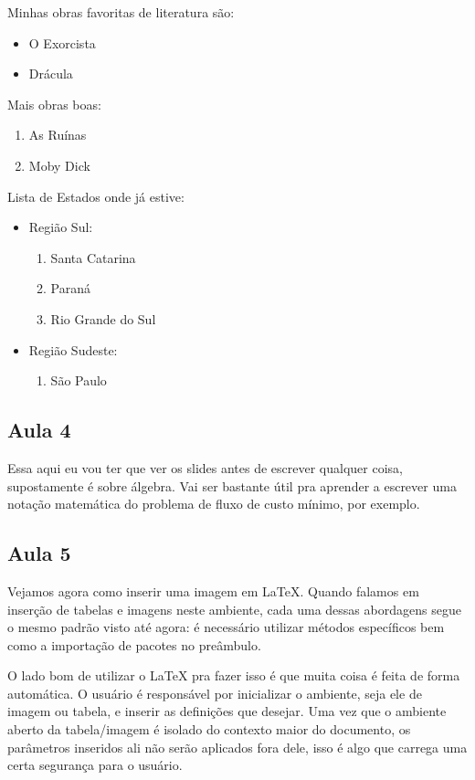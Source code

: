 \documentclass[12pt, a4paper, twocolumn] {article} %
\begin{document}
Minhas obras favoritas de literatura são:
\begin{itemize} %
    \item O Exorcista
    \item Drácula
\end{itemize}


Mais obras boas:
\begin{enumerate} %
    \item As Ruínas
    \item Moby Dick
\end{enumerate}


Lista de Estados onde já estive:
\begin{itemize} %
    \item Região Sul:
    \begin{enumerate}
        \item Santa Catarina
        \item Paraná
        \item Rio Grande do Sul
    \end{enumerate}
    \item Região Sudeste:
    \begin{enumerate}
        \item São Paulo
    \end{enumerate}
\end{itemize}


\subsection{Aula 4}
Essa aqui eu vou ter que ver os slides antes de escrever qualquer coisa, supostamente é sobre álgebra. Vai ser bastante útil pra aprender a escrever uma notação matemática do problema de fluxo de custo mínimo, por exemplo.

\subsection{Aula 5}
Vejamos agora como inserir uma imagem em \LaTeX. Quando falamos em inserção de tabelas e imagens neste ambiente, cada uma dessas abordagens segue o mesmo padrão visto até agora: é necessário utilizar métodos específicos bem como a importação de pacotes no preâmbulo.

O lado bom de utilizar o LaTeX pra fazer isso é que muita coisa é feita de forma automática. O usuário é responsável por inicializar o ambiente, seja ele de imagem ou tabela, e inserir as definições que desejar. Uma vez que o ambiente aberto da tabela/imagem é isolado do contexto maior do documento, os parâmetros inseridos ali não serão aplicados fora dele, isso é algo que carrega uma certa segurança para o usuário.~\cite{tanenbaum2014}
\end{document}
